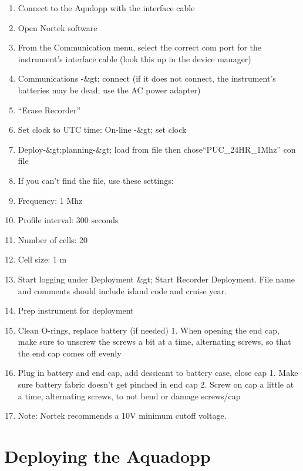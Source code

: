 \documentclass[]{book}
\providecommand{\tightlist}{%
  \setlength{\itemsep}{0pt}\setlength{\parskip}{0pt}}
\begin{document}
\begin{enumerate}
\def\labelenumi{\arabic{enumi}.}
\tightlist
\item
  Connect to the Aqudopp with the interface cable
\item
  Open Nortek software
\item
  From the Communication menu, select the correct com port for the instrument's interface cable (look this up in the device manager)
\item
  Communications -\&gt; connect (if it does not connect, the instrument's batteries may be dead; use the AC power adapter)
\item
  ``Erase Recorder''
\item
  Set clock to UTC time: On-line -\&gt; set clock
\item
  Deploy-\&gt;planning-\&gt; load from file then chose``PUC\_24HR\_1Mhz'' con file
\item
  If you can't find the file, use these settings:
\item
  Frequency: 1 Mhz
\item
  Profile interval: 300 seconds
\item
  Number of cells: 20
\item
  Cell size: 1 m
\item
  Start logging under Deployment \&gt; Start Recorder Deployment. File name and comments should include island code and cruise year.
\item
  Prep instrument for deployment
\item
  Clean O-rings, replace battery (if needed)
  1. When opening the end cap, make sure to unscrew the screws a bit at a time, alternating screws, so that the end cap comes off evenly
\item
  Plug in battery and end cap, add dessicant to battery case, close cap
  1. Make sure battery fabric doesn't get pinched in end cap
  2. Screw on cap a little at a time, alternating screws, to not bend or damage screws/cap
\item
  Note: Nortek recommends a 10V minimum cutoff voltage.
\end{enumerate}

\hypertarget{deploying-the-aquadopp}{%
\section{Deploying the Aquadopp}\label{deploying-the-aquadopp}}
\end{document}
